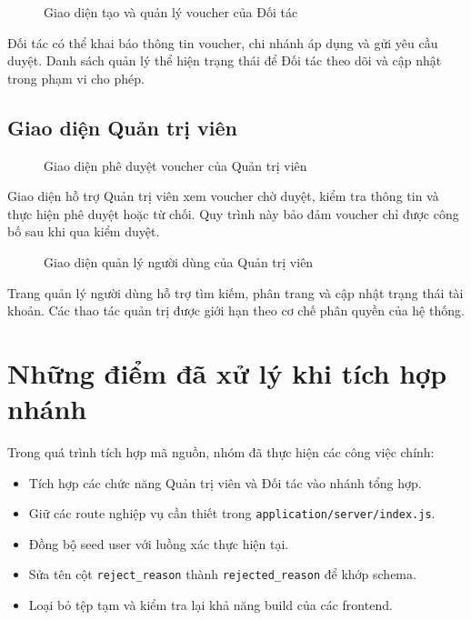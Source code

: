 \begin{figure}[H]
\centering
{}
\caption{Giao diện tạo và quản lý voucher của Đối tác}
\end{figure}
Đối tác có thể khai báo thông tin voucher, chi nhánh áp dụng và gửi yêu cầu duyệt. Danh sách quản lý thể hiện trạng thái để Đối tác theo dõi và cập nhật trong phạm vi cho phép.

\subsection{Giao diện Quản trị viên}

\begin{figure}[H]
\centering
{}
\caption{Giao diện phê duyệt voucher của Quản trị viên}
\end{figure}
Giao diện hỗ trợ Quản trị viên xem voucher chờ duyệt, kiểm tra thông tin và thực hiện phê duyệt hoặc từ chối. Quy trình này bảo đảm voucher chỉ được công bố sau khi qua kiểm duyệt.

\begin{figure}[H]
\centering
{}
\caption{Giao diện quản lý người dùng của Quản trị viên}
\end{figure}
Trang quản lý người dùng hỗ trợ tìm kiếm, phân trang và cập nhật trạng thái tài khoản. Các thao tác quản trị được giới hạn theo cơ chế phân quyền của hệ thống.

\section{Những điểm đã xử lý khi tích hợp nhánh}

Trong quá trình tích hợp mã nguồn, nhóm đã thực hiện các công việc chính:

\begin{itemize}[leftmargin=1.2cm]
    \item Tích hợp các chức năng Quản trị viên và Đối tác vào nhánh tổng hợp.
    \item Giữ các route nghiệp vụ cần thiết trong \texttt{application/server/index.js}.
    \item Đồng bộ seed user với luồng xác thực hiện tại.
    \item Sửa tên cột \texttt{reject\_reason} thành \texttt{rejected\_reason} để khớp schema.
    \item Loại bỏ tệp tạm và kiểm tra lại khả năng build của các frontend.
\end{itemize}
